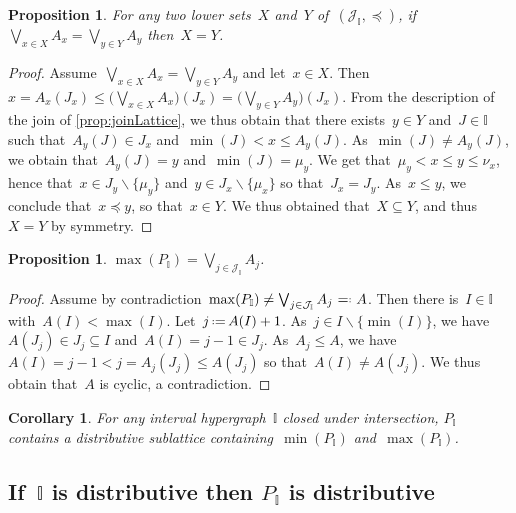 \documentclass{amsart}
\newtheorem{corollary}[theorem]{Corollary}
\newtheorem{proposition}[theorem]{Proposition}
\theoremstyle{definition}
\newcommand{\cal}[1]{\mathcal{#1}} %
\newcommand{\ssm}{\smallsetminus} %
\newcommand{\eqdef}{\mbox{\,\raisebox{0.2ex}{\scriptsize\ensuremath{\mathrm:}}\ensuremath{=}\,}} %
\newcommand{\defeq}{\mbox{~\ensuremath{=}\raisebox{0.2ex}{\scriptsize\ensuremath{\mathrm:}} }} %
\newcommand{\bigJoin}{\bigvee} %
\newcommand{\II}{\mathbb I} %
\newcommand{\cJ}{\cal{J}} %
\begin{document}
\begin{proposition}
\label{prop:injectivityDistributive}
For any two lower sets~$X$ and~$Y$ of~$(\cJ_\II, \preccurlyeq)$, if~$\bigJoin\limits_{x \in X} A_x = \bigJoin\limits_{y \in Y} A_y$ then~$X = Y$.
\end{proposition}

\begin{proof}
Assume~$\bigJoin\limits_{x \in X} A_x = \bigJoin\limits_{y \in Y} A_y$ and let~$x \in X$.
Then $x = A_x(J_x) \le \big( \bigJoin\limits_{x \in X} A_x \big)(J_x) = \big( \bigJoin\limits_{y \in Y} A_y \big)(J_x)$.
From the description of the join of \cref{prop:joinLattice}, we thus obtain that there exists~$y \in Y$ and~$J \in \II$ such that~$A_y(J) \in J_x$ and~$\min(J) < x \le A_y(J)$.
As~$\min(J) \ne A_y(J)$, we obtain that~$A_y(J) = y$ and~$\min(J) = \mu_y$.
We get that~$\mu_y < x \le y \le \nu_x$, hence that~$x \in J_y \ssm \{\mu_y\}$ and~$y \in J_x \ssm \{\mu_x\}$ so that~$J_x = J_y$.
As~$x \le y$, we conclude that~$x \preccurlyeq y$, so that~$x \in Y$.
We thus obtained that~$X \subseteq Y$, and thus~$X = Y$ by symmetry.
\end{proof}

\begin{proposition}
$\displaystyle \max(P_\II) = \bigJoin\limits_{j \in \cJ_\II} A_j$.
\end{proposition}

\begin{proof}
Assume by contradiction~$\max(P_\II) \ne \bigJoin_{j \in \cJ_\II} A_j \defeq A$.
Then there is~$I \in \II$ with~${A(I) < \max(I)}$.
Let~$j \eqdef A(I) + 1$.
As~$j \in I \ssm \{\min(I)\}$, we have~$A(J_j) \in J_j \subseteq I$ and~$A(I) = j-1 \in J_j$.
As~$A_j \le A$, we have~$A(I) = j-1 < j = A_j(J_j) \le A(J_j)$ so that~$A(I) \ne A(J_j)$.
We thus obtain that~$A$ is cyclic, a contradiction.
\end{proof}

\begin{corollary}
For any interval hypergraph~$\II$ closed under intersection, $P_\II$ contains a distributive sublattice containing~$\min(P_\II)$ and~$\max(P_\II)$.
\end{corollary}


\subsection{If~$\II$ is distributive then $P_\II$ is distributive}
\label{subsec:distributiveLatticeBackward}
\end{document}
